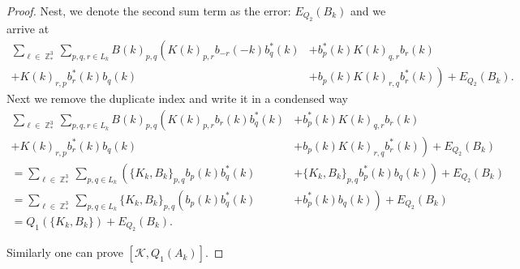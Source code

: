 \documentclass[sn-mathphys,Numbered, a4paper ,nocrop]{sn-jnl}%
\DeclareMathOperator{\Z}{\mathbb{Z}}
\theoremstyle{plain}
\theoremstyle{definition}
\theoremstyle{remark}
\theoremstyle{plain}
\theoremstyle{definition}
\theoremstyle{remark}
\begin{document}
\begin{proof}
Nest, we denote the second sum term as the error: $E_{Q_2}(B_k)$ and we arrive at
\begin{align}
    \sum\limits_{\ell \in \Z^3_*}\sum\limits_{p,q,r \in L_{k}}B(k)_{p,q}\left(K(k)_{p,r}b_{-r}(-k)b^*_{q}(k) \right.&+\left. b^*_p(k)K(k)_{q,r}b_{r}(k)\right. \nonumber\\
    +\left. K(k)_{r,p}b^*_{r}(k) b_{q}(k)\right. &+\left. b_{p}(k)K(k)_{r,q}b^*_{r}(k) \right) + E_{Q_2}(B_k).\label{eq:1000} 
\end{align}
Next we remove the duplicate index and write it in a condensed way
\begin{align}
    \sum\limits_{\ell \in \Z^3_*}\sum\limits_{p,q,r \in L_{k}}B(k)_{p,q}\left(K(k)_{p,r}b_{r}(k)b^*_{q}(k) \right.&+\left. b^*_p(k)K(k)_{q,r}b_{r}(k)\right. \nonumber\\
    +\left. K(k)_{r,p}b^*_{r}(k) b_{q}(k)\right. &+\left. b_{p}(k)K(k)_{r,q}b^*_{r}(k) \right) + E_{Q_2}(B_k)\\
    = \sum\limits_{\ell \in \Z^3_*}\sum\limits_{p,q \in L_{k}} \left(\{K_k,B_k\}_{p,q}b_{p}(k)b^*_{q}(k) \right.&+\left. \{K_k,B_k\}_{p,q}b^*_{p}(k) b_{q}(k)\right) + E_{Q_2}(B_k)\\
    =\sum\limits_{\ell \in \Z^3_*} \sum\limits_{p,q \in L_{k}}\{K_k,B_k\}_{p,q} \left(b_{p}(k)b^*_{q}(k) \right.&+\left.b^*_{p}(k) b_{q}(k)\right) + E_{Q_2}(B_k)\\
    = Q_1(\{K_k,B_k\}) + E_{Q_2}(B_k).
\end{align}

Similarly one can prove $[\mathcal{K}, Q_1(A_k)]$.
\end{proof}
\newpage
\end{document}
